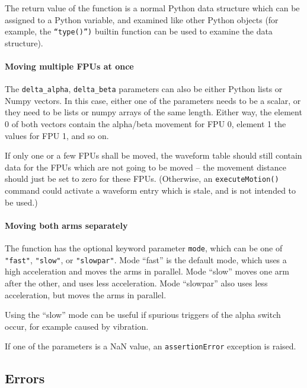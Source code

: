 \documentclass[11pt,a4paper]{report}
\begin{document}
The return value of the function is a normal Python data structure
which can be assigned to a Python variable, and examined like other
Python objects (for example, the \texttt{``type()'')} builtin function
can be used to examine the data structure).

\paragraph{Moving multiple FPUs at once}
 The
\verb+delta_alpha+, \verb+delta_beta+ parameters can also be either
Python lists or Numpy vectors. In this case, either one of the
parameters needs to be a scalar, or they need to be lists or numpy
arrays of the same length. Either way, the element 0 of both vectors
contain the alpha/beta movement for FPU 0, element 1 the values for
FPU 1, and so on.

If only one or a few FPUs shall be moved, the waveform table should
still contain data for the FPUs which are not going to be moved -- the
movement distance should just be set to zero for these FPUs.
(Otherwise, an \texttt{executeMotion()} command could activate a
waveform entry which is stale, and is not intended to be used.)

\paragraph{Moving both arms separately}

The function has the optional keyword parameter \texttt{mode}, which
can be one of \texttt{"fast"}, \texttt{"slow"}, or \texttt{"slowpar"}.
Mode ``fast'' is the default mode, which uses a high acceleration and
moves the arms in parallel. Mode ``slow'' moves one arm after the
other, and uses less acceleration. Mode ``slowpar'' also uses less
acceleration, but moves the arms in parallel.

Using the ``slow'' mode can be useful if spurious triggers of the
alpha switch occur, for example caused by vibration.

If one of the parameters is a NaN value, an \texttt{assertionError}
exception is raised.


\subsection{Errors}
\label{sec:errors}
\end{document}
